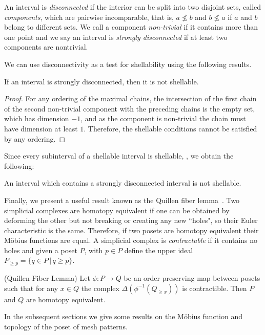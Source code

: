 \documentclass[11pt,a4paper,oneside]{article}
\begin{document}
An interval is \emph{disconnected} if the interior can be split into two disjoint sets, called
\emph{components}, which are pairwise incomparable, that is, $a\not\le b$ and $b\not\le a$ if
$a$ and $b$ belong to different sets. We call a component \emph{non-trivial} if it contains more than one point
and we say an interval is \emph{strongly disconnected} if at least two components are nontrivial.

We can use disconnectivity as a test for shellability using the following results.

\begin{lem}\label{lem:strongdis}
If an interval is strongly disconnected, then it is not shellable.
\begin{proof}
For any ordering of the maximal chains, the intersection of the first chain of the second non-trivial
component with the preceding chains is the empty set, which has dimension $-1$, and as the component is
non-trivial the chain must have dimension at least $1$. Therefore, the shellable conditions cannot be
satisfied by any ordering.
\end{proof}
\end{lem}

Since every subinterval of a shellable interval is shellable, \cite[Corollary 3.1.9]{Wac07},
we obtain the following:

\begin{cor}
An interval which contains a strongly disconnected interval is not shellable.
\end{cor}

Finally, we present a useful result known as the Quillen fiber lemma~\cite{Quillen78}. Two simplicial
complexes are homotopy equivalent  if one can be obtained by deforming the other but
not breaking or creating any new ``holes", so their Euler
characteristic is the same. Therefore, if two posets are homotopy equivalent their
M\"obius functions are equal. A simplicial complex is \emph{contractable} if it contains
no holes and given a poset $P$, with $p \in P$ define the upper ideal $P_{\ge p}=\{q\in P\,|\,q\ge p\}$.

\begin{prop}\label{thm:Quil}(Quillen Fiber Lemma)
Let $\phi:P\rightarrow Q$ be an order-preserving map between posets such that for any
$x\in Q$ the complex $\Delta(\phi^{-1}(Q_{\ge x}))$ is contractible.
Then $P$ and $Q$ are homotopy equivalent.
\end{prop}

In the subsequent sections we give some results on the M\"obius function and topology of
the poset of mesh patterns.
\end{document}
